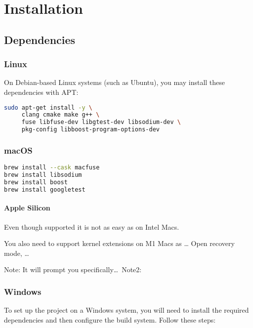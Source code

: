 \chapter{Installation}

\section{Dependencies}\label{sec:dependencies}

\subsection*{Linux}

On Debian-based Linux systems (such as Ubuntu), you may install these dependencies with APT:

\begin{lstlisting}[language=bash, basicstyle=\ttfamily\small]
sudo apt-get install -y \
     clang cmake make g++ \
     fuse libfuse-dev libgtest-dev libsodium-dev \
     pkg-config libboost-program-options-dev
\end{lstlisting}

\subsection*{macOS}

\begin{lstlisting}[language=bash, basicstyle=\ttfamily\small]
brew install --cask macfuse
brew install libsodium
brew install boost
brew install googletest
\end{lstlisting}

\subsubsection{Apple Silicon}

Even though supported it is not as easy as on Intel Macs.

You also need to support kernel extensions on M1 Macs as \ldots
Open recovery mode, \ldots

Note: It will prompt you specifically\ldots\
Note2:

\subsection*{Windows}


To set up the project on a Windows system, you will need to install the required dependencies and then configure the build system. Follow these steps:

